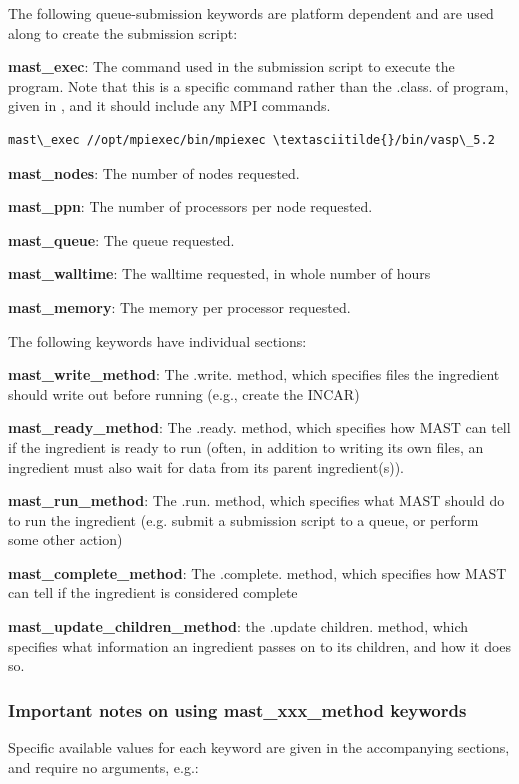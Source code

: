 \documentclass[letterpaper,10pt,english]{sphinxmanual}
\begin{document}
The following queue-submission keywords are platform dependent and are used along to create the submission script:

\textbf{mast\_exec}: The command used in the submission script to execute the program. Note that this is a specific command rather than the .class. of program, given in , and it should include any MPI commands.

\begin{Verbatim}[commandchars=\\\{\}]
mast\_exec //opt/mpiexec/bin/mpiexec \textasciitilde{}/bin/vasp\_5.2
\end{Verbatim}

\textbf{mast\_nodes}: The number of nodes requested.

\textbf{mast\_ppn}: The number of processors per node requested.

\textbf{mast\_queue}: The queue requested.

\textbf{mast\_walltime}: The walltime requested, in whole number of hours

\textbf{mast\_memory}: The memory per processor requested.

The following keywords have individual sections:

\textbf{mast\_write\_method}: The .write. method, which specifies files the ingredient should write out before running (e.g., create the INCAR)

\textbf{mast\_ready\_method}: The .ready. method, which specifies how MAST can tell if the ingredient is ready to run (often, in addition to writing its own files, an ingredient must also wait for data from its parent ingredient(s)).

\textbf{mast\_run\_method}: The .run. method, which specifies what MAST should do to run the ingredient (e.g. submit a submission script to a queue, or perform some other action)

\textbf{mast\_complete\_method}: The .complete. method, which specifies how MAST can tell if the ingredient is considered complete

\textbf{mast\_update\_children\_method}: the .update children. method, which specifies what information an ingredient passes on to its children, and how it does so.


\subsubsection{Important notes on using mast\_xxx\_method keywords}
\label{3_0_inputfile:important-notes-on-using-mast-xxx-method-keywords}\label{3_0_inputfile:important-notes}
Specific available values for each keyword are given in the accompanying sections, and require no arguments, e.g.:
\end{document}
